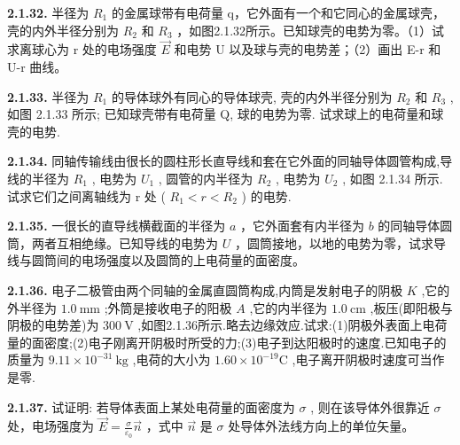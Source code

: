 \begin{center}
\end{center}

\vfill
\newpage

\textbf{2.1.32.} 半径为 $R_{1}$ 的金属球带有电荷量 q，它外面有一个和它同心的金属球壳，壳的内外半径分别为 $R_{2}$ 和 $R_{3}$ ，如图2.1.32所示。已知球壳的电势为零。（1）试求离球心为 r 处的电场强度 $\vec{E}$ 和电势 U 以及球与壳的电势差；（2）画出 E-r 和 U-r 曲线。

\vfill
\newpage

\textbf{2.1.33.} 半径为 $R_{1}$ 的导体球外有同心的导体球壳, 壳的内外半径分别为 $R_{2}$ 和 $R_{3}$ , 如图 2.1.33 所示; 已知球壳带有电荷量 Q, 球的电势为零. 试求球上的电荷量和球壳的电势.

\vfill
\newpage

\textbf{2.1.34.} 同轴传输线由很长的圆柱形长直导线和套在它外面的同轴导体圆管构成,导线的半径为 $R_{1}$ , 电势为 $U_{1}$ , 圆管的内半径为 $R_{2}$ , 电势为 $U_{2}$ , 如图 2.1.34 所示. 试求它们之间离轴线为 r 处 ( $R_{1} < r < R_{2}$ ) 的电势.

\vfill
\newpage

\textbf{2.1.35.} 一很长的直导线横截面的半径为 $a$ ，它外面套有内半径为 $b$ 的同轴导体圆筒，两者互相绝缘。已知导线的电势为 $U$ ，圆筒接地，以地的电势为零，试求导线与圆筒间的电场强度以及圆筒的上电荷量的面密度。

\vfill
\newpage

\textbf{2.1.36.} 电子二极管由两个同轴的金属直圆筒构成,内筒是发射电子的阴极 $K$ ,它的外半径为 $1.0 \mathrm{~mm}$ ;外筒是接收电子的阳极 $A$ ,它的内半径为 $1.0 \mathrm{~cm}$ ,板压(即阳极与阴极的电势差)为 $300 \mathrm{~V}$ ,如图2.1.36所示.略去边缘效应.试求:(1)阴极外表面上电荷量的面密度;(2)电子刚离开阴极时所受的力;(3)电子到达阳极时的速度.已知电子的质量为 $9.11 \times 10^{-31} \mathrm{~kg}$ ,电荷的大小为 $1.60 \times 10^{-19} \mathrm{C}$ ,电子离开阴极时速度可当作是零.

\begin{center}
\end{center}

\vfill
\newpage

\textbf{2.1.37.} 试证明: 若导体表面上某处电荷量的面密度为 $\sigma$ , 则在该导体外很靠近 $\sigma$ 处，电场强度为 $\displaystyle \vec{E} = \frac{\sigma}{\varepsilon_0}\vec{n}$ ，式中 $\vec{n}$ 是 $\sigma$ 处导体外法线方向上的单位矢量。

\vfill
\newpage

